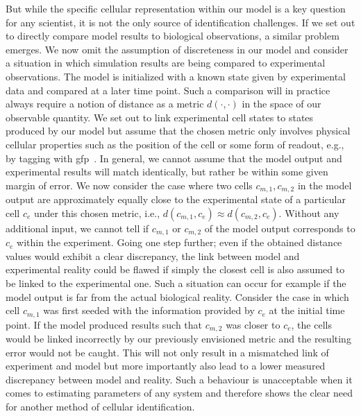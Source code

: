 But while the specific cellular representation within our model is a key question for any scientist,
it is not the only source of identification challenges.
If we set out to directly compare model results to biological observations, a similar problem
emerges.
We now omit the assumption of discreteness in our model and consider a situation in which simulation
results are being compared to experimental observations.
The model is initialized with a known state given by experimental data and compared at a later time
point.
Such a comparison will in practice always require a notion of distance as a metric $d(\cdot,\cdot)$
in the space of our observable quantity.
We set out to link experimental cell states to states produced by our model but assume that the
chosen metric only involves physical cellular properties such as the position of the cell or some
form of readout, e.g., by tagging with \ac{gfp}~\cite{Chalfie1994}.
In general, we cannot assume that the model output and experimental results will match identically,
but rather be within some given margin of error.
We now consider the case where two cells $c_{m,1},c_{m,2}$ in the model output are approximately
equally close to the experimental state of a particular cell $c_e$ under this chosen metric, i.e.,
$d(c_{m,1},c_e)\approx d(c_{m,2},c_e)$.
Without any additional input, we cannot tell if $c_{m,1}$ or $c_{m,2}$ of the model output
corresponds to $c_e$ within the experiment.
Going one step further; even if the obtained distance values would exhibit a clear discrepancy, the
link between model and experimental reality could be flawed if simply the closest cell is also
assumed to be linked to the experimental one.
Such a situation can occur for example if the model output is far from the
actual biological reality.
Consider the case in which cell $c_{m,1}$ was first seeded with the information provided by
$c_e$ at the initial time point.
If the model produced results such that $c_{m,2}$ was closer to $c_e$,
the cells would be linked incorrectly by our previously envisioned metric and the resulting error
would not be caught.
This will not only result in a mismatched link of experiment and model but more importantly also
lead to a lower measured discrepancy between model and reality.
Such a behaviour is unacceptable when it comes to estimating parameters of any system and therefore
shows the clear need for another method of cellular identification.


